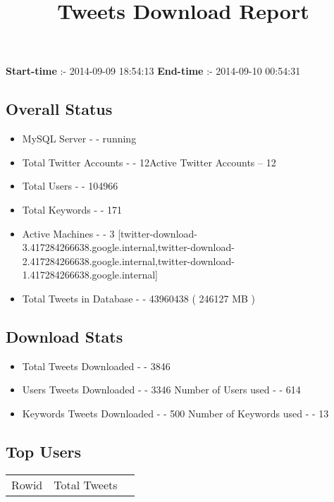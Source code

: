 \documentclass{article}\usepackage[T1]{fontenc}
\begin{document}
\title{\textbf{Tweets Download Report}}
               \date{}
                \maketitle
               \centerline{\textbf{Start-time} :- 2014-09-09 18:54:13 \hspace{40pt} \textbf{End-time} :- 2014-09-10 00:54:31}               \subsection*{Overall Status}                \begin{itemize}                \item MySQL Server - - running               \item Total Twitter Accounts - - 12\newline Active Twitter Accounts -- 12               \item Total Users - - 104966               \item Total Keywords - - 171               \item Active Machines - - 3 [twitter-download-3.417284266638.google.internal,twitter-download-2.417284266638.google.internal,twitter-download-1.417284266638.google.internal]               \item Total Tweets in Database - - 43960438 ( 246127 MB )               \end{itemize}               \subsection*{Download Stats}                \begin{itemize}                \item Total Tweets Downloaded - - 3846               \item Users Tweets Downloaded - - 3346 \newline Number of Users used - - 614               \item Keywords Tweets Downloaded - - 500 \newline Number of Keywords used - - 13              \end{itemize}              \subsection*{Top Users}\begin{tabular}{|c|c|c|}         \hline         Rowid & Total Tweets \\ 

\end{tabular}
\end{document}
